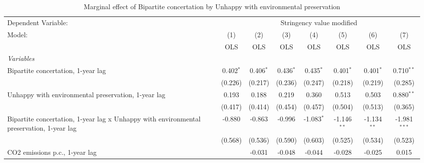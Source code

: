 
\begin{table}[htbp]
   \caption{Marginal effect of Bipartite concertation by Unhappy with environmental preservation}
   \centering
   \begin{tabular}{lccccccc}
      \toprule
      Dependent Variable: & \multicolumn{7}{c}{Stringency value modified}\\
      Model:                                                                                   & (1)         & (2)         & (3)           & (4)           & (5)           & (6)           & (7)\\  
                                                                                               &  OLS        & OLS         & OLS           & OLS           & OLS           & OLS           & OLS\\  
      \midrule
      \emph{Variables}\\
      Bipartite concertation, 1-year lag                                                       & 0.402$^{*}$ & 0.406$^{*}$ & 0.436$^{*}$   & 0.435$^{*}$   & 0.401$^{*}$   & 0.401$^{*}$   & 0.710$^{**}$\\   
                                                                                               & (0.226)     & (0.217)     & (0.236)       & (0.247)       & (0.218)       & (0.219)       & (0.285)\\   
      Unhappy with environmental preservation, 1-year lag                                      & 0.193       & 0.188       & 0.219         & 0.360         & 0.513         & 0.503         & 0.880$^{**}$\\   
                                                                                               & (0.417)     & (0.414)     & (0.454)       & (0.457)       & (0.504)       & (0.513)       & (0.365)\\   
      Bipartite concertation, 1-year lag x Unhappy with environmental preservation, 1-year lag & -0.880      & -0.863      & -0.996        & -1.083$^{*}$  & -1.146$^{**}$ & -1.134$^{**}$ & -1.981$^{***}$\\   
                                                                                               & (0.568)     & (0.536)     & (0.590)       & (0.603)       & (0.525)       & (0.534)       & (0.523)\\   
      CO2 emissions p.c., 1-year lag                                                           &             & -0.031      & -0.048        & -0.044        & -0.028        & -0.025        & 0.015\\   

\end{tabular}
\end{table}
